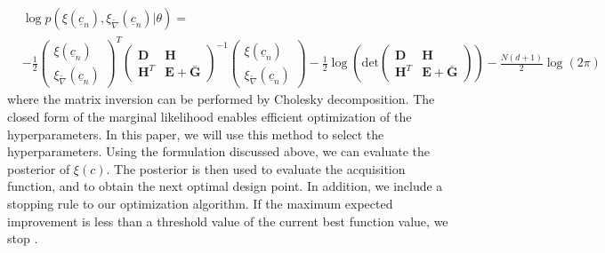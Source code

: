 \documentclass[a4paper,onecolumn]{article}
\theoremstyle{remark}
\begin{document}
\begin{equation}\begin{split}
    & \log p(\xi(\underline{c}_n), \xi_{\tilde{\nabla}}(\underline{c}_n) | \theta) =\\
    & - \frac{1}{2} 
    \begin{pmatrix}
        \xi(\underline{c}_n)\\ \xi_{\tilde{\nabla}}(\underline{c}_n)
    \end{pmatrix}^T
    \begin{pmatrix}
        \mathbf{D}& \mathbf{H}\\
        \mathbf{H}^T & \mathbf{E}+\bar{\mathbf{G}}
    \end{pmatrix}^{-1}
    \begin{pmatrix}
        \xi(\underline{c}_n)\\ \xi_{\tilde{\nabla}}(\underline{c}_n)
    \end{pmatrix}
    - \frac{1}{2}
    \log \left(\textrm{det}
        \begin{pmatrix}
            \mathbf{D}& \mathbf{H}\\
            \mathbf{H}^T & \mathbf{E}+\bar{\mathbf{G}}
        \end{pmatrix}       
    \right)
    - \frac{N(d+1)}{2} \log(2\pi)
\end{split}\label{likelihood eqn}
\end{equation}
where the matrix inversion can be performed by Cholesky decomposition.
The closed form of the marginal likelihood enables efficient optimization of the hyperparameters.
In this paper, we will use this method to select the hyperparameters.
Using the formulation discussed above, we can evaluate the posterior of $\xi(c)$.
The posterior is then used to 
evaluate the acquisition function, and to obtain the next optimal design point.
In addition, we include a stopping rule to our optimization algorithm. If the maximum expected
improvement is less than a threshold value of the current best function value, we stop \cite{jones1998}.
\end{document}

